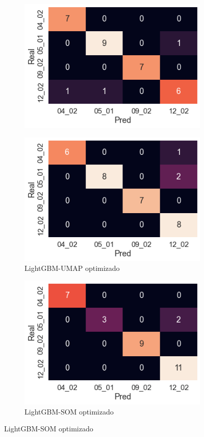 \documentclass[12pt]{article}
\begin{document}
\begin{figure}[htbp]
\begin{subfigure}[b]{0.35\textwidth}
        \includegraphics[width=\textwidth]{LightGBMPCARopt.png}
    \end{subfigure}
    \begin{subfigure}[b]{0.35\textwidth}
        \caption{LightGBM-UMAP optimizado}
        \includegraphics[width=\textwidth]{LightGBMUMAPopt.png}
    \end{subfigure}
    \begin{subfigure}[b]{0.35\textwidth}
        \caption{LightGBM-SOM optimizado}
        \includegraphics[width=\textwidth]{LightGBMSOMopt.png}

\end{subfigure}
\end{figure}
\end{document}
